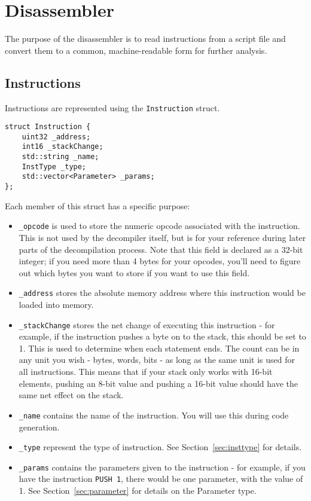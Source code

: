 \section{Disassembler}
The purpose of the disassembler is to read instructions from a script file and convert them to a common, machine-readable form for further analysis.

\subsection{Instructions}
Instructions are represented using the \verb+Instruction+ struct.

\begin{C++}
\begin{lstlisting}
struct Instruction {
	uint32 _address;
	int16 _stackChange;
	std::string _name;
	InstType _type;
	std::vector<Parameter> _params;
};
\end{lstlisting}
\end{C++}

Each member of this struct has a specific purpose:
\begin{itemize}
\item \verb+_opcode+ is used to store the numeric opcode associated with the instruction. This is not used by the decompiler itself, but is for your reference during later parts of the decompilation process. Note that this field is declared as a 32-bit integer; if you need more than 4 bytes for your opcodes, you'll need to figure out which bytes you want to store if you want to use this field.
\item \verb+_address+ stores the absolute memory address where this instruction would be loaded into memory.
\item \verb+_stackChange+ stores the net change of executing this instruction - for example, if the instruction pushes a byte on to the stack, this should be set to 1. This is used to determine when each statement ends. The count can be in any unit you wish - bytes, words, bits - as long as the same unit is used for all instructions. This means that if your stack only works with 16-bit elements, pushing an 8-bit value and pushing a 16-bit value should have the same net effect on the stack.
\item \verb+_name+ contains the name of the instruction. You will use this during code generation.
\item \verb+_type+ represent the type of instruction. See Section~\vref{sec:insttype} for details.
\item \verb+_params+ contains the parameters given to the instruction - for example, if you have the instruction \verb+PUSH 1+, there would be one parameter, with the value of 1. See Section~\vref{sec:parameter} for details on the Parameter type.
\end{itemize}

